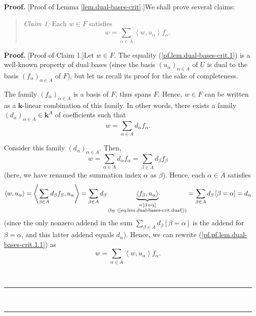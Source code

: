 \documentclass[numbers=enddot,12pt,final,onecolumn,notitlepage]{scrartcl}%
\theoremstyle{definition}
\newenvironment{statement}{\begin{quote}}{\end{quote}}
\newenvironment{proof}[1][Proof]{\noindent\textbf{#1.} }{\ \rule{0.5em}{0.5em}}
\let\sumnonlimits\sum
\renewcommand{\sum}{\sumnonlimits\limits}
\newenvironment{vershort}{}{}
\begin{document}
\begin{proof}
[Proof of Lemma \ref{lem.dual-bases-crit}.]We shall prove several claims:

\begin{statement}
\textit{Claim 1:} Each $w\in F$ satisfies%
\begin{equation}
w=\sum_{\alpha\in A}\left\langle w,u_{\alpha}\right\rangle f_{\alpha}.
\label{pf.lem.dual-bases-crit.1}%
\end{equation}

\end{statement}

\begin{proof}
[Proof of Claim 1.]Let $w\in F$. The equality (\ref{pf.lem.dual-bases-crit.1})
is a well-known property of dual bases (since the basis $\left(  u_{\alpha
}\right)  _{\alpha\in A}$ of $U$ is dual to the basis $\left(  f_{\alpha
}\right)  _{\alpha\in A}$ of $F$), but let us recall its proof for the sake of completeness.

The family $\left(  f_{\alpha}\right)  _{\alpha\in A}$ is a basis of $F$, thus
spans $F$. Hence, $w\in F$ can be written as a $\mathbf{k}$-linear combination
of this family. In other words, there exists a family $\left(  d_{\alpha
}\right)  _{\alpha\in A}\in\mathbf{k}^{A}$ of coefficients such that%
\begin{equation}
w=\sum_{\alpha\in A}d_{\alpha}f_{\alpha}.
\label{pf.pf.lem.dual-bases-crit.1.1}%
\end{equation}


\begin{vershort}
\noindent Consider this family $\left(  d_{\alpha}\right)  _{\alpha\in A}$.
Then,
\[
w=\sum_{\alpha\in A}d_{\alpha}f_{\alpha}=\sum_{\beta\in A}d_{\beta}f_{\beta}%
\]
(here, we have renamed the summation index $\alpha$ as $\beta$). Hence, each
$\alpha\in A$ satisfies%
\begin{equation}
\left\langle w,u_{\alpha}\right\rangle =\left\langle \sum_{\beta\in A}%
d_{\beta}f_{\beta},u_{\alpha}\right\rangle =\sum_{\beta\in A}d_{\beta
}\underbrace{\left\langle f_{\beta},u_{\alpha}\right\rangle }%
_{\substack{=\left[  \beta=\alpha\right]  \\\text{(by
(\ref{eq.lem.dual-bases-crit.dual}))}}}=\sum_{\beta\in A}d_{\beta}\left[
\beta=\alpha\right]  =d_{\alpha}\nonumber
\end{equation}
(since the only nonzero addend in the sum $\sum_{\beta\in A}d_{\beta}\left[
\beta=\alpha\right]  $ is the addend for $\beta=\alpha$, and this latter
addend equals $d_{\alpha}$). Hence, we can rewrite
(\ref{pf.pf.lem.dual-bases-crit.1.1}) as%
\[
w=\sum_{\alpha\in A}\left\langle w,u_{\alpha}\right\rangle f_{\alpha}.
\]


\end{vershort}
\end{proof}
\end{proof}
\end{document}
